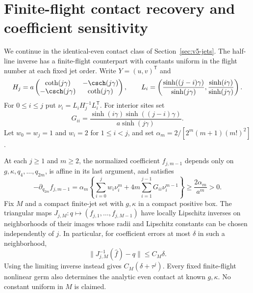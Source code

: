 \section{Finite-flight contact recovery and coefficient sensitivity}
\label{sec:v6-finite-jets}
We continue in the identical-even contact class of
Section~\ref{sec:v5-jets}. The half-line inverse has a finite-flight
counterpart with constants uniform in the flight number at each fixed
jet order. Write $Y=(u,v)^{\mathsf T}$ and
\begin{equation}\label{eq:v6-finite-quadratic}
 H_j=a\begin{pmatrix}\coth(j\gamma)&-\csch(j\gamma)\\
              -\csch(j\gamma)&\coth(j\gamma)\end{pmatrix},\qquad
 L_i=\left(\frac{\sinh((j-i)\gamma)}{\sinh(j\gamma)},
           \frac{\sinh(i\gamma)}{\sinh(j\gamma)}\right).
\end{equation}
For $0\le i\le j$ put $\nu_i=L_iH_j^{-1}L_i^{\mathsf T}$.
For interior sites set
\[
 G_{ii}=\frac{\sinh(i\gamma)\sinh((j-i)\gamma)}{a\sinh(j\gamma)}.
\]
Let $w_0=w_j=1$ and $w_i=2$ for $1\le i<j$, and set
$\alpha_m=2/[2^m(m+1)(m!)^2]$.

\begin{theorem}
\label{thm:v6-finite-jets}
At each $j\ge1$ and $m\ge2$, the normalized coefficient
$f_{j,m-1}$ depends only on $g,\kappa,q_4,\ldots,q_{2m}$, is affine
in its last argument, and satisfies
\begin{equation}\label{eq:v6-finite-diagonal}
 -\partial_{q_{2m}}f_{j,m-1}
 =\alpha_m\left\{\sum_{i=0}^j w_i\nu_i^m
            +4m\sum_{i=1}^{j-1}G_{ii}\nu_i^{m-1}\right\}
 \ge\frac{2\alpha_m}{a^m}>0.
\end{equation}
Fix $M$ and a compact finite-jet set with $g,\kappa$ in a compact
positive box. The triangular maps
$J_{j,M}:q\mapsto(f_{j,1},\ldots,f_{j,M-1})$ have locally
Lipschitz inverses on neighborhoods of their images whose radii and
Lipschitz constants can be chosen independently of $j$. In particular,
for coefficient errors at most $\delta$ in such a neighborhood,
\begin{equation}\label{eq:v6-jet-error}
 \|J_{j,M}^{-1}(\widehat f)-q\|\le C_M\delta.
\end{equation}
Using the limiting inverse instead gives $C_M(\delta+\tau^j)$.
Every fixed finite-flight nonlinear germ also determines the analytic
even contact at known $g,\kappa$. No constant uniform in $M$ is claimed.
\end{theorem}

